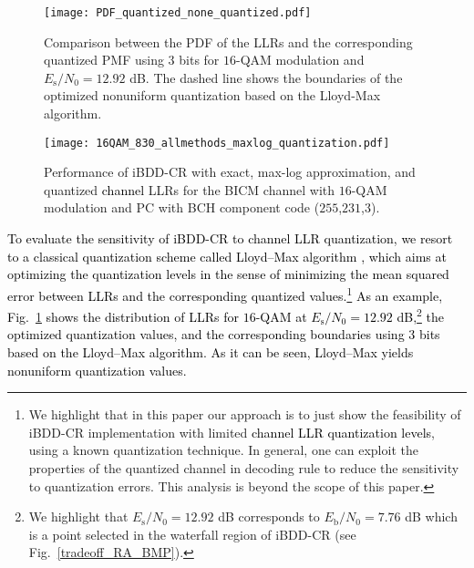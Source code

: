 \documentclass[journal]{IEEEtran}
\newcommand{\SH}{\textcolor{black}}
\newcommand{\GL}{\textcolor{black}}
\begin{document}
\begin{figure}[t] \centering 
	\texttt{[image: PDF\_quantized\_none\_quantized.pdf]}  
	\caption{Comparison between the PDF of the LLRs and the corresponding quantized PMF using $3$ bits for $16$-QAM modulation and $E_\mathrm{s}/N_0=12.92$ dB. The dashed line shows the boundaries of the optimized nonuniform quantization based on the Lloyd-Max algorithm.}  \vspace{-4ex}
	\label{quant_comp} 
\end{figure} 


\begin{figure}[t] \centering 
	\texttt{[image: 16QAM\_830\_allmethods\_maxlog\_quantization.pdf]}  
	\caption{Performance of iBDD-CR with exact, max-log approximation, and quantized \SH{channel} LLRs for the BICM channel with $16$-QAM modulation and PC with BCH component code ($255$,$231$,$3$).}  %
	\label{Max_loyd_alg} 
\end{figure}  

 
\SH{To evaluate the sensitivity of iBDD-CR to channel LLR quantization,
we resort to a classical quantization scheme called \GL{Lloyd–Max} algorithm \cite{Max1960,Lloyd1980}, which \GL{aims at optimizing} the quantization levels in the sense of minimizing the mean squared error between LLRs and the corresponding quantized values.\footnote{We highlight that in this paper our approach is to just show the feasibility of iBDD-CR implementation with limited \SH{channel LLR quantization levels}, using a known quantization technique. In general, one can exploit the properties of the quantized channel in decoding rule to reduce the sensitivity to quantization errors. This analysis is beyond the scope of this paper.}
As an example, Fig.~\ref{quant_comp} shows the distribution of LLRs for $16$-QAM at $E_\mathrm{s}/N_0=12.92$ dB,\footnote{We highlight that $E_\mathrm{s}/N_0=12.92$ dB corresponds to $E_\mathrm{b}/N_0=7.76$ dB which is a point selected in the waterfall region of iBDD-CR (see Fig.~\ref{tradeoff_RA_BMP}).} the optimized quantization values, and the corresponding boundaries using $3$ bits based on the \GL{Lloyd–Max} algorithm. 
As it can be seen, Lloyd–Max yields nonuniform quantization values.} 
\end{document}
